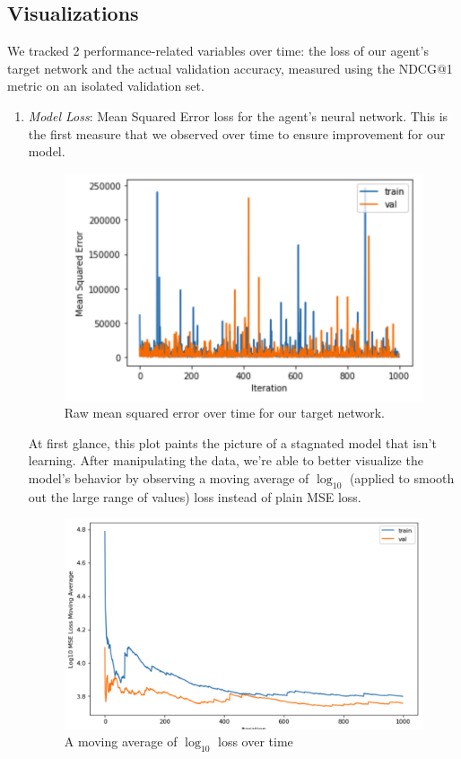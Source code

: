 \documentclass{article}
\begin{document}
\subsection{Visualizations}

We tracked 2 performance-related variables over time: the loss of our agent's target network and the actual validation accuracy, measured using the NDCG@1 metric on an isolated validation set.

\begin{enumerate}
    \item \textit{Model Loss}: Mean Squared Error loss for the agent's neural network. This is the first measure that we observed over time to ensure improvement for our model.
    
    \begin{figure}[h]
        \centering
        \includegraphics[scale=0.7]{bigloss.png}
        \caption{Raw mean squared error over time for our target network.}
        \label{fig:my_label}
    \end{figure}
    
    At first glance, this plot paints the picture of a stagnated model that isn't learning. After manipulating the data, we're able to better visualize the model's behavior by observing a moving average of $\log_{10}$ (applied to smooth out the large range of values) loss instead of plain MSE loss.
    
    \begin{figure}[h]
        \centering
        \includegraphics[scale=0.45]{movinglossval.png}
        \caption{A moving average of $\log_{10}$ loss over time}
        \label{fig:my_label}
    \end{figure}
    

\end{enumerate}
\end{document}
